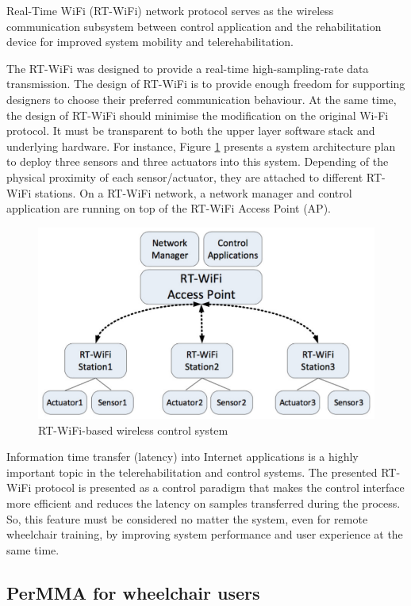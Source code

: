 Real-Time WiFi (RT-WiFi) network protocol serves as the wireless communication subsystem between control application and the rehabilitation device for improved system mobility and telerehabilitation. 

The RT-WiFi was designed to provide a real-time high-sampling-rate data transmission. The design of RT-WiFi is to provide enough freedom for supporting designers to choose their preferred communication behaviour. At the same time, the design of RT-WiFi should minimise the modification on the original Wi-Fi protocol. It must be transparent to both the upper layer software stack and underlying hardware. For instance, Figure \ref{fig:wei2013-RTWiFibased} presents a system architecture plan to deploy three sensors and three actuators into  this system. Depending of the physical proximity of each sensor/actuator, they are attached to different RT-WiFi stations. On a RT-WiFi network, a network manager and control application are running on top of the RT-WiFi Access Point (AP).

\begin{figure}[!hbt]
\begin{center}
\includegraphics[width=0.7 \textwidth]{img/cap3/wei2013-RTWiFibased}
\caption{RT-WiFi-based wireless control system \cite{wei2013}}
\label{fig:wei2013-RTWiFibased}
\end{center}
\end{figure}

Information time transfer (latency) into Internet applications is a highly important topic in the telerehabilitation and control systems. The presented RT-WiFi protocol is presented as a control paradigm that makes the control interface more efficient and reduces the latency on samples transferred during the process. So, this feature must be considered no matter the system, even for remote wheelchair training, by improving system performance and user experience at the same time. 


\subsection{PerMMA for wheelchair users}
\label{subsec:cooper2012}

